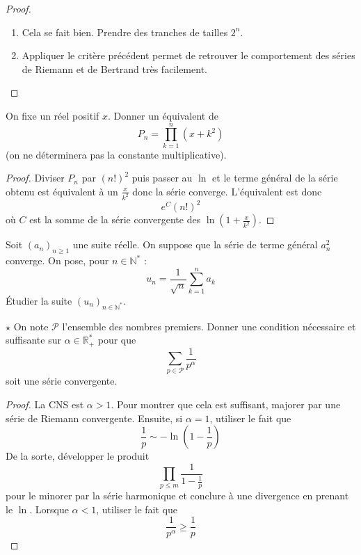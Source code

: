 \documentclass[french,a4paper]{article}
\newcommand{\N}{\mathbb{N}}
\newcommand{\R}{\mathbb{R}}
\newcommand{\st}{^*}
\theoremstyle{plain}
\theoremstyle{definition}
\theoremstyle{remark}
\begin{document}
\begin{proof}
	\begin{enumerate}
		\item Cela se fait bien. Prendre des tranches de tailles $2^n$.
		\item Appliquer le critère précédent permet de retrouver le comportement des séries de Riemann et de Bertrand très facilement.
	\end{enumerate}
\end{proof}

\begin{ex}{}
	On fixe un réel positif $x$. Donner un équivalent de $$P_n=\prod_{k=1}^{n}(x+k^2)$$ (on ne déterminera pas la constante multiplicative).
\end{ex}

\begin{proof}
	Diviser $P_n$ par $(n!)^2$ puis passer au $\ln$ et le terme général de la série obtenu est équivalent à un $\displaystyle\frac{x}{k^2}$ donc la série converge. L'équivalent est donc $$e^{C}(n!)^2$$ où $C$ est la somme de la série convergente des $\ln\left(1+\frac{x}{k^2}\right)$.
\end{proof}

\begin{ex}{}
	Soit $(a_n)_{n\geqslant 1}$ une suite réelle. On suppose que la série de terme général $a_n^2$ converge. On pose, pour $n\in\N\st$ : $$u_n=\frac{1}{\sqrt{n}}\sum_{k=1}^{n}a_k$$ Étudier la suite $(u_n)_{n\in\N\st}$.
\end{ex}

\begin{ex}[]{$\star$}
	On note $\mathcal{P}$ l'ensemble des nombres premiers. Donner une condition nécessaire et suffisante sur $\alpha\in\R_+\st$ pour que $$\sum_{p\in\mathcal{P}}\frac{1}{p^\alpha}$$ soit une série convergente.
\end{ex}

\begin{proof}
	La CNS est $\alpha >1$. Pour montrer que cela est suffisant, majorer par une série de Riemann convergente. Ensuite, si $\alpha=1$, utiliser le fait que $$\frac{1}{p}\sim -\ln\left(1-\frac{1}{p}\right)$$ De la sorte, développer le produit $$\prod_{p\leqslant m}\frac{1}{1-\frac{1}{p}}$$ pour le minorer par la série harmonique et conclure à une divergence en prenant le $\ln$. Lorsque $\alpha<1$, utiliser le fait que $$\frac{1}{p^\alpha}\geqslant\frac{1}{p}$$
\end{proof}
\end{document}
